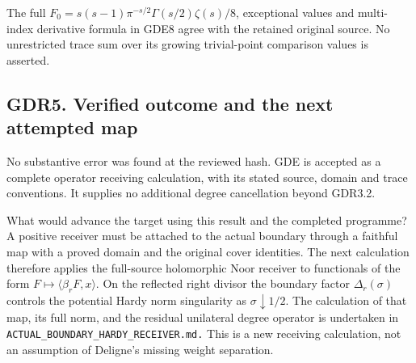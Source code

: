 The full \(F_0=s(s-1)\pi^{-s/2}\Gamma(s/2)\zeta(s)/8\), exceptional
values and multi-index derivative formula in GDE8 agree with the
retained original source. No unrestricted trace sum over its growing
trivial-point comparison values is asserted.

\subsection{GDR5. Verified outcome and the next attempted
map}\label{gdr5.-verified-outcome-and-the-next-attempted-map}

No substantive error was found at the reviewed hash. GDE is accepted as
a complete operator receiving calculation, with its stated source,
domain and trace conventions. It supplies no additional degree
cancellation beyond GDR3.2.

What would advance the target using this result and the completed
programme? A positive receiver must be attached to the actual boundary
through a faithful map with a proved domain and the original cover
identities. The next calculation therefore applies the full-source
holomorphic Noor receiver to functionals of the form
\(F\mapsto\langle\beta_rF,x\rangle\). On the reflected right divisor the
boundary factor \(\Delta_r(\sigma)\) controls the potential Hardy norm
singularity as \(\sigma\downarrow1/2\). The calculation of that map, its
full norm, and the residual unilateral degree operator is undertaken in
\nolinkurl{ACTUAL_BOUNDARY_HARDY_RECEIVER.md.} This is a new receiving
calculation, not an assumption of Deligne's missing weight separation.
